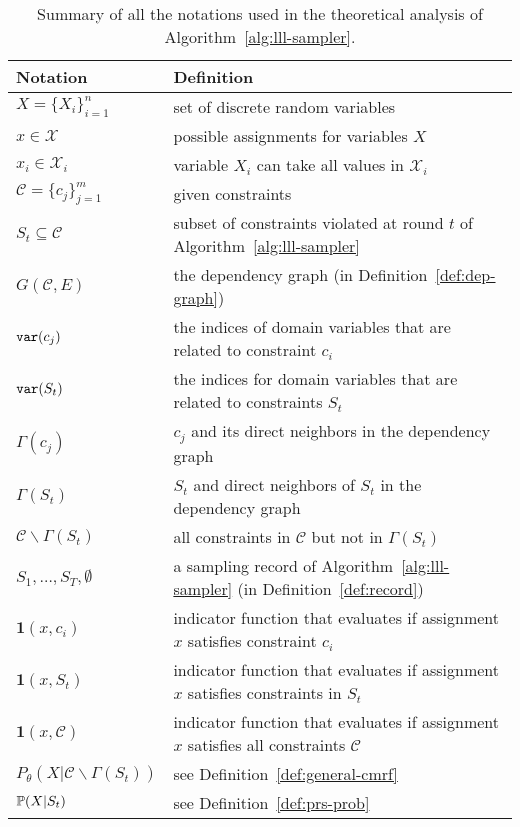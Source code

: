 \begin{table}[!t]
    \centering
    \caption{Summary of all the notations used in the theoretical analysis of Algorithm~\ref{alg:lll-sampler}.}\label{tab:quantifier}
    \begin{tabular}{ll}
    \hline
    Notation& Definition \\
    \hline
        $X=\{X_i\}_{i=1}^n$ & set of discrete random variables \\
        \hline
        $x\in\mathcal{X}$ & possible assignments for variables $X$ \\
        \hline
        $x_i\in\mathcal{X}_i$ & variable $X_i$ can take all values in $\mathcal{X}_i$\\
        \hline
        $\mathcal{C}=\{c_j\}_{j=1}^{m}$ & given constraints \\
        \hline
        $S_t\subseteq\mathcal{C}$& subset of constraints violated at round  $t$ of Algorithm~\ref{alg:lll-sampler} \\
        \hline
        $G(\mathcal{C},E)$& the dependency graph (in Definition~\ref{def:dep-graph})\\
        \hline
        $\mathtt{var}(c_j)$& the indices of domain variables that are related to constraint $c_i$\\
        \hline
        $\mathtt{var}(S_t)$& the indices for domain variables that are related to constraints $S_t$\\
        \hline
        $\Gamma(c_j)$ &$c_j$ and its direct neighbors in the dependency graph\\
        \hline
        $\Gamma(S_t)$ &$S_t$ and direct neighbors of $S_t$ in the      dependency graph\\
        \hline
        $\mathcal{C}\backslash \Gamma(S_t)$ &all constraints in $\mathcal{C}$ but not in $\Gamma(S_t)$ \\
        \hline
        $S_1,\ldots,S_{T},\emptyset$ & a sampling record of Algorithm~\ref{alg:lll-sampler}  (in Definition~\ref{def:record}) \\
        \hline
        $\mathbf{1}(x,c_i)$ & indicator function that evaluates if    assignment $x$ satisfies constraint $c_i$ \\
        \hline
        $\mathbf{1}(x,S_t)$ & indicator function that evaluates if assignment $x$ satisfies constraints in $S_t$ \\
        \hline
        $\mathbf{1}(x,\mathcal{C})$ & indicator function that evaluates if  assignment $x$ satisfies all constraints $\mathcal{C}$ \\
        \hline
        $P_{\theta}(X|\mathcal{C}\backslash\Gamma(S_t))$& see Definition~\ref{def:general-cmrf}\\
        \hline
        $\mathbb{P}(X|S_t)$ & see Definition~\ref{def:prs-prob}\\
    \hline
    \end{tabular}
\end{table}


